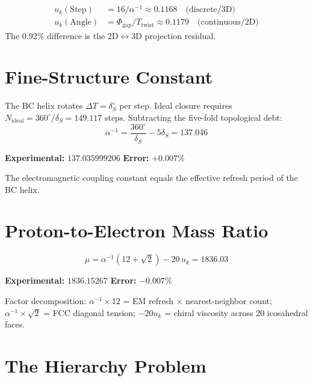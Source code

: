 \documentclass[12pt,a4paper,twocolumn]{article}
\newcommand{\dS}{\delta_{\!S}}
\newcommand{\Ttwist}{T_{\mathrm{twist}}}
\newcommand{\uk}{u_k}
\begin{document}
\begin{align}
\uk(\text{Step}) &= 16/\alpha^{-1} \approx 0.1168 \quad\text{(discrete/3D)} \\
\uk(\text{Angle}) &= \Phi_{\mathrm{gap}}/\Ttwist \approx 0.1179 \quad\text{(continuous/2D)}
\end{align}
The $0.92\%$ difference is the 2D$\leftrightarrow$3D projection residual.


\section{Fine-Structure Constant}

The BC helix rotates $\Delta T = \dS^\circ$ per step. Ideal closure requires $N_{\mathrm{ideal}} = 360^\circ/\dS = 149.117$ steps. Subtracting the five-fold topological debt:
\begin{equation}
\boxed{\;\alpha^{-1} = \frac{360^\circ}{\dS} - 5\dS = 137.046\;}
\label{eq:alpha}
\end{equation}

\textbf{Experimental:} $137.035999206$ \quad \textbf{Error:} $+0.007\%$

The electromagnetic coupling constant equals the effective refresh period of the BC helix.


\section{Proton-to-Electron Mass Ratio}

\begin{equation}
\boxed{\;\mu = \alpha^{-1}(12+\sqrt{2}) - 20\,\uk = 1836.03\;}
\label{eq:mu}
\end{equation}

\textbf{Experimental:} $1836.15267$ \quad \textbf{Error:} $-0.007\%$

Factor decomposition: $\alpha^{-1}\times 12$ = EM refresh $\times$ nearest-neighbor count; $\alpha^{-1}\times\sqrt{2}$ = FCC diagonal tension; $-20\uk$ = chiral viscosity across 20 icosahedral faces.


\section{The Hierarchy Problem}
\end{document}
